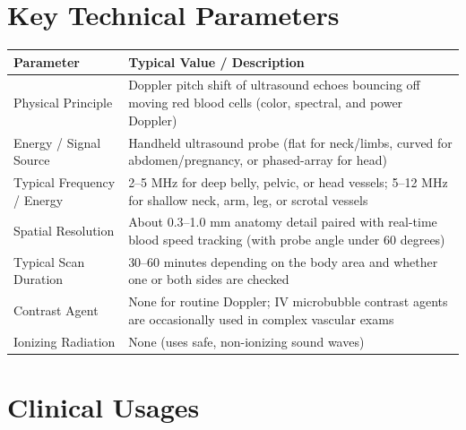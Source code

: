 \section{Key Technical Parameters}
\noindent
\begin{tabularx}{\textwidth}{@{}l X@{}}
\toprule
\textbf{Parameter} & \textbf{Typical Value / Description} \\
\midrule
Physical Principle & Doppler pitch shift of ultrasound echoes bouncing off moving red blood cells (color, spectral, and power Doppler) \\
Energy / Signal Source & Handheld ultrasound probe (flat for neck/limbs, curved for abdomen/pregnancy, or phased-array for head) \\
Typical Frequency / Energy & 2--5 MHz for deep belly, pelvic, or head vessels; 5--12 MHz for shallow neck, arm, leg, or scrotal vessels \\
Spatial Resolution & About 0.3--1.0 mm anatomy detail paired with real-time blood speed tracking (with probe angle under 60 degrees) \\
Typical Scan Duration & 30--60 minutes depending on the body area and whether one or both sides are checked \\
Contrast Agent & None for routine Doppler; IV microbubble contrast agents are occasionally used in complex vascular exams \\
Ionizing Radiation & None (uses safe, non-ionizing sound waves) \\
\bottomrule
\end{tabularx}

\section{Clinical Usages}

